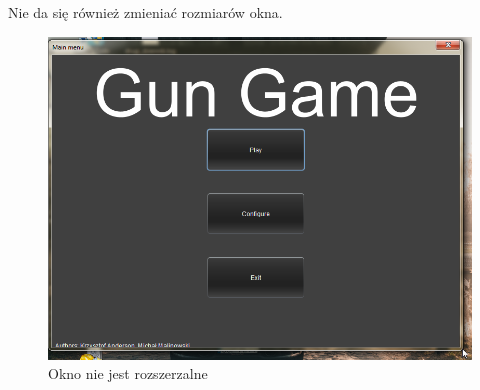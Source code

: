 \documentclass[12pt]{report}
\begin{document}
    \newpage
    Nie da się również zmieniać rozmiarów okna.
    \begin{figure}[H]
    \centering
    \includegraphics[width=14cm]{obrazy/resizable.png}
    \caption{Okno nie jest rozszerzalne}
    \label{not resizable}
    \end{figure}
\end{document}
